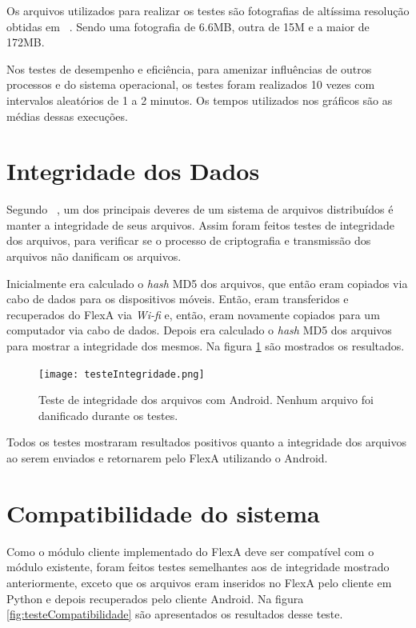     Os arquivos utilizados para realizar os testes são fotografias de altíssima resolução obtidas em  ~\cite{hubble}. Sendo uma fotografia de 6.6MB, outra de 15M e a maior de 172MB.
     
     
     Nos testes de desempenho e eficiência, para amenizar influências de outros processos e do sistema operacional, os testes foram realizados 10 vezes com intervalos aleatórios de 1 a 2 minutos. Os tempos utilizados nos gráficos são as médias dessas execuções.

\section{Integridade dos Dados}

    Segundo ~, um dos principais deveres de um sistema de arquivos distribuídos é manter a integridade de seus arquivos. Assim foram feitos testes de integridade dos arquivos, para verificar se o processo de criptografia e transmissão dos arquivos não danificam os arquivos. 
    
    Inicialmente era calculado o \textit{hash} MD5 dos arquivos, que então eram copiados via cabo de dados para os dispositivos móveis. Então, eram transferidos e recuperados do FlexA via \textit{Wi-fi} e, então, eram novamente copiados para um computador via cabo de dados. Depois era calculado o \textit{hash} MD5 dos arquivos para mostrar a integridade dos mesmos. Na figura \ref{fig:testesIntegridade} são mostrados os resultados.

    \begin{figure}[!ht]
    \centering
    \texttt{[image: testeIntegridade.png]}
    \caption{Teste de integridade dos arquivos com Android. Nenhum arquivo foi danificado durante os testes.}
    \label{fig:testesIntegridade}
    \end{figure}

    Todos os testes mostraram resultados positivos quanto a integridade dos arquivos ao serem enviados e retornarem pelo FlexA utilizando o Android.
    
\section{Compatibilidade do sistema}

    Como o módulo cliente implementado do FlexA deve ser compatível com o módulo existente, foram feitos testes semelhantes aos de integridade mostrado anteriormente, exceto que os arquivos eram inseridos no FlexA pelo cliente em Python e depois recuperados pelo cliente Android. Na figura \ref{fig:testeCompatibilidade} são apresentados os resultados desse teste.
    
